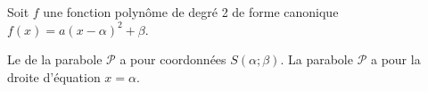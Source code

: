 \begin{Propriete}
    Soit $f$ une fonction polynôme de degré 2 de forme canonique $f(x) = a(x-\alpha)^{2} + \beta$.
    
    \begin{tcbenumerate}[2]
        \tcbitem Le de la parabole $\mathcal{P}$ a pour coordonnées $S(\alpha;\beta)$.
        \tcbitem La parabole $\mathcal{P}$ a pour la droite d'équation $x=\alpha$.
    \end{tcbenumerate}
\end{Propriete}